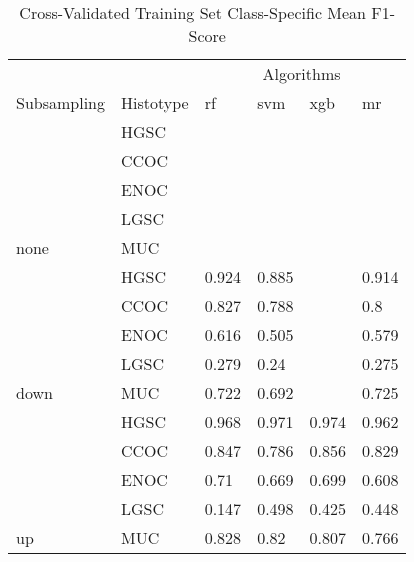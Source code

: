 \documentclass[
]{report}
\begin{document}
\begin{table}

\caption{\label{tab:train-f1-class-table}Cross-Validated Training Set Class-Specific Mean F1-Score}
\centering
\begin{tabular}[t]{l|l|l|l|l|l}
\hline
\multicolumn{2}{c|}{ } & \multicolumn{4}{c}{Algorithms} \\
\cline{3-6}
Subsampling & Histotype & rf & svm & xgb & mr\\
\hline
 & HGSC & \cellcolor[HTML]{FFD700}{0.97} & \cellcolor[HTML]{FFD700}{0.972} & \cellcolor[HTML]{FF0000}{0.9} & \cellcolor[HTML]{FF0000}{0.969}\\
\cline{2-6}
 & CCOC & \cellcolor[HTML]{FFD700}{0.861} & \cellcolor[HTML]{FFD700}{0.836} & \cellcolor[HTML]{FF0000}{0.31} & \cellcolor[HTML]{FF0000}{0.846}\\
\cline{2-6}
 & ENOC & \cellcolor[HTML]{FFD700}{0.641} & \cellcolor[HTML]{FFD700}{0.741} & \cellcolor[HTML]{FF0000}{NaN} & \cellcolor[HTML]{FF0000}{0.72}\\
\cline{2-6}
 & LGSC & \cellcolor[HTML]{FFD700}{0.7} & \cellcolor[HTML]{FFD700}{0.444} & \cellcolor[HTML]{FF0000}{NaN} & \cellcolor[HTML]{FF0000}{NaN}\\
\cline{2-6}
\multirow{-5}{*}{\raggedright\arraybackslash none} & MUC & \cellcolor[HTML]{FFD700}{0.848} & \cellcolor[HTML]{FFD700}{0.834} & \cellcolor[HTML]{FF0000}{NaN} & \cellcolor[HTML]{FF0000}{0.869}\\
\cline{1-6}
 & HGSC & 0.924 & 0.885 & \cellcolor[HTML]{FF0000}{0.904} & 0.914\\
\cline{2-6}
 & CCOC & 0.827 & 0.788 & \cellcolor[HTML]{FF0000}{NaN} & 0.8\\
\cline{2-6}
 & ENOC & 0.616 & 0.505 & \cellcolor[HTML]{FF0000}{0.117} & 0.579\\
\cline{2-6}
 & LGSC & 0.279 & 0.24 & \cellcolor[HTML]{FF0000}{0.032} & 0.275\\
\cline{2-6}
\multirow{-5}{*}{\raggedright\arraybackslash down} & MUC & 0.722 & 0.692 & \cellcolor[HTML]{FF0000}{NaN} & 0.725\\
\cline{1-6}
 & HGSC & 0.968 & 0.971 & 0.974 & 0.962\\
\cline{2-6}
 & CCOC & 0.847 & 0.786 & 0.856 & 0.829\\
\cline{2-6}
 & ENOC & 0.71 & 0.669 & 0.699 & 0.608\\
\cline{2-6}
 & LGSC & 0.147 & 0.498 & 0.425 & 0.448\\
\cline{2-6}
\multirow{-5}{*}{\raggedright\arraybackslash up} & MUC & 0.828 & 0.82 & 0.807 & 0.766\\

\end{tabular}
\end{table}
\end{document}
